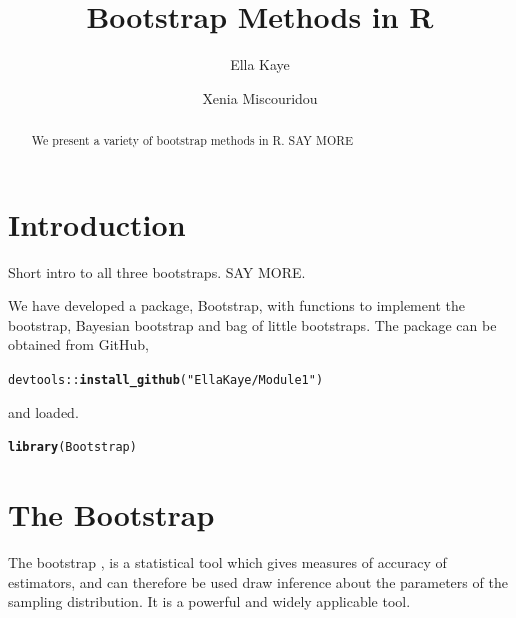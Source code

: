 \documentclass{article}\usepackage[]{graphicx}\usepackage[]{color}
\title{Bootstrap Methods in R}
\author{Ella Kaye \and Xenia Miscouridou}
\makeatletter
\newcommand{\hlstr}[1]{\textcolor[rgb]{0.192,0.494,0.8}{#1}}%
\newcommand{\hlopt}[1]{\textcolor[rgb]{0,0,0}{#1}}%
\newcommand{\hlstd}[1]{\textcolor[rgb]{0.345,0.345,0.345}{#1}}%
\newcommand{\hlkwd}[1]{\textcolor[rgb]{0.737,0.353,0.396}{\textbf{#1}}}%
\newenvironment{kframe}{%
 \def\at@end@of@kframe{}%
 \ifinner\ifhmode%
  \def\at@end@of@kframe{\end{minipage}}%
  \begin{minipage}{\columnwidth}%
 \fi\fi%
 \def\FrameCommand##1{\hskip\@totalleftmargin \hskip-\fboxsep
 \colorbox{shadecolor}{##1}\hskip-\fboxsep
     \hskip-\linewidth \hskip-\@totalleftmargin \hskip\columnwidth}%
 \MakeFramed {\advance\hsize-\width
   \@totalleftmargin\z@ \linewidth\hsize
   \@setminipage}}%
 {\par\unskip\endMakeFramed%
 \at@end@of@kframe}
\newenvironment{knitrout}{}{} %
\makeatother
\begin{document}
\maketitle

\begin{abstract}
We present a variety of bootstrap methods in R.
SAY MORE
\end{abstract}

\section{Introduction}
Short intro to all three bootstraps. SAY MORE.



We have developed a package, Bootstrap, with functions to implement the bootstrap, Bayesian bootstrap and bag of little bootstraps. The package can be obtained from GitHub,
\begin{knitrout}
\color{fgcolor}\begin{kframe}
\begin{alltt}
\hlstd{devtools}\hlopt{::}\hlkwd{install_github}\hlstd{(}\hlstr{"EllaKaye/Module1"}\hlstd{)}
\end{alltt}
\end{kframe}
\end{knitrout}
and loaded.
\begin{knitrout}
\color{fgcolor}\begin{kframe}
\begin{alltt}
\hlkwd{library}\hlstd{(Bootstrap)}
\end{alltt}
\end{kframe}
\end{knitrout}


\section{The Bootstrap}
The bootstrap \parencite{Efron1979}, is a statistical tool which gives measures of accuracy of estimators, and can therefore be used draw inference about the parameters of the sampling distribution. It is a powerful and widely applicable tool.
\end{document}
